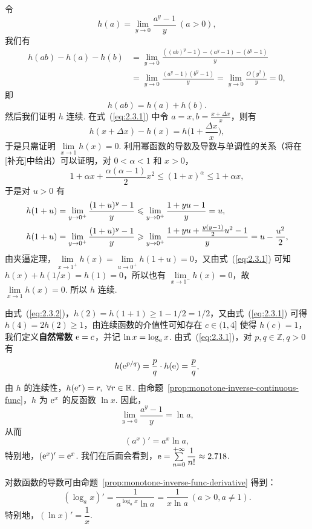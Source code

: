 \documentclass[../main.tex]{subfiles}
\begin{document}
令 
$$
h(a) = \lim_{y \to 0} \frac{a^y - 1}{y}\ (a > 0), 
$$
我们有
\begin{align*}
    h(ab) - h(a) - h(b) &= \lim_{y \to 0} \frac{((ab)^y - 1) - (a^y - 1) - (b^y - 1)}{y} \\
    &= \lim_{y \to 0} \frac{(a^y - 1)(b^y - 1)}{y} = \lim_{y \to 0} \frac{O(y^2)}{y} = 0, 
\end{align*}
即
\begin{equation} \label{eq:2.3.1}
    h(ab) = h(a) + h(b). 
\end{equation}
然后我们证明 $h$ 连续. 在式~(\ref{eq:2.3.1}) 中令 $a = x, b = \frac{x + \Delta x}{x}$，则有
$$
h(x + \Delta x) - h(x) = h\bigg(1 + \frac{\Delta x}{x} \bigg), 
$$
于是只需证明 $\lim\limits_{x \to 1} h(x) = 0$. 利用幂函数的导数及导数与单调性的关系（将在{\color{red}[补充]}中给出）可以证明，对 $0 < \alpha < 1$ 和 $x > 0$，
$$
1 + \alpha x + \frac{\alpha(\alpha - 1)}{2} x^2 \leqslant (1 + x)^\alpha \leqslant 1 + \alpha x, 
$$
于是对 $u > 0$ 有
\begin{align}
    h(1 + u) &= \lim_{y \to 0^+} \frac{(1 + u)^y - 1}{y} \leqslant \lim_{y \to 0^+} \frac{1 + yu - 1}{y} = u,  \notag \\
    h(1 + u) &= \lim_{y \to 0^+} \frac{(1 + u)^y - 1}{y} \geqslant \lim_{y \to 0^+} \frac{1 + yu + \frac{y(y - 1)}{2} u^2 - 1}{y} = u - \frac{u^2}{2}, \label{eq:2.3.2}
\end{align}
由夹逼定理，$\lim\limits_{x \to 1^+} h(x) = \lim\limits_{u \to 0^+} h(1 + u) = 0$，又由式~(\ref{eq:2.3.1}) 可知 $h(x) + h(1 / x) = h(1) = 0$，所以也有 $\lim\limits_{x \to 1^-} h(x) = 0$，故 $\lim\limits_{x \to 1} h(x) = 0$. 所以 $h$ 连续. 

由式~(\ref{eq:2.3.2})，$h(2) = h(1 + 1) \geqslant 1 - 1 / 2 = 1 / 2$，又由式~(\ref{eq:2.3.1}) 可得 $h(4) = 2 h(2) \geqslant 1$，由连续函数的介值性可知存在 $c \in (1, 4]$ 使得 $h(c) = 1$，我们定义\textbf{自然常数} $\mathrm{e} = c$，并记 $\ln x = \log_{\mathrm{e}} x$. 由式~(\ref{eq:2.3.1})，对 $p, q \in \mathbb Z, q > 0$ 有
$$
h(\mathrm{e}^{p / q}) = \frac{p}{q} \cdot h(\mathrm{e}) = \frac{p}{q}, 
$$
由 $h$ 的连续性，$h(\mathrm{e}^r) = r,\ \forall r \in \mathbb R$. 由命题~\ref{prop:monotone-inverse-continuous-func}，$h$ 为 $\mathrm{e}^x$ 的反函数 $\ln x$. 因此，
$$
\lim_{y \to 0} \frac{a^y - 1}{y} = \ln a, 
$$
从而 
$$
(a^x)' = a^x \ln a, 
$$
特别地，$(\mathrm{e}^x)' = \mathrm{e}^x$. 我们在后面会看到，$\mathrm{e} = \sum\limits_{n = 0}^{+\infty} \dfrac{1}{n!} \approx 2.718$. 

对数函数的导数可由命题~\ref{prop:monotone-inverse-func-derivative} 得到：
$$
(\log_a x)' = \frac{1}{a^{\log_a x} \ln a} = \frac{1}{x \ln a}\ (a > 0, a \neq 1). 
$$
特别地，$(\ln x)' = \dfrac{1}{x}$. 
\end{document}
